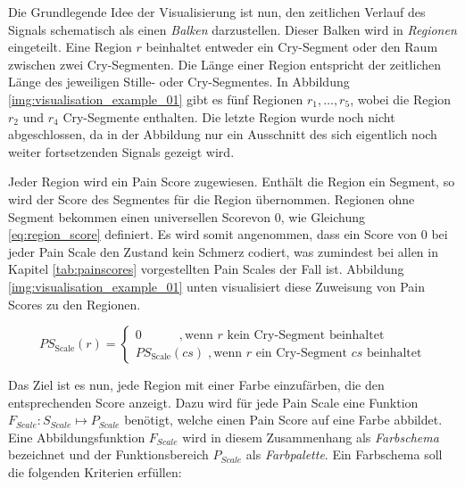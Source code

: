 Die Grundlegende Idee der Visualisierung ist nun, den zeitlichen Verlauf des Signals schematisch als einen \emph{Balken} darzustellen. Dieser Balken wird in \emph{Regionen} eingeteilt. Eine Region $r$ beinhaltet entweder ein Cry-Segment oder den Raum zwischen zwei Cry-Segmenten. Die Länge einer Region entspricht der zeitlichen Länge des jeweiligen Stille- oder Cry-Segmentes. In Abbildung \ref{img:visualisation_example_01} gibt es fünf Regionen $r_{1} , \ldots , r_5 $, wobei die Region $r_2$ und $r_4$ Cry-Segmente enthalten. Die letzte Region wurde noch nicht abgeschlossen, da in der Abbildung nur ein Ausschnitt des sich eigentlich noch weiter fortsetzenden Signals gezeigt wird.

Jeder Region wird ein Pain Score zugewiesen. Enthält die Region ein Segment, so wird der Score des Segmentes für die Region übernommen. Regionen ohne Segment bekommen einen \glqq universellen Score\grqq von 0, wie Gleichung  \ref{eq:region_score} definiert. Es wird somit angenommen, dass ein Score von 0 bei jeder Pain Scale den Zustand \glqq kein Schmerz\grqq{} codiert, was zumindest bei allen in Kapitel \ref{tab:painscores} vorgestellten Pain Scales der Fall ist. Abbildung \ref{img:visualisation_example_01} unten visualisiert diese Zuweisung von Pain Scores zu den Regionen.

\begin{equation}
PS_{\text{Scale}}(r) = \begin{cases}
 0 \quad \quad \quad,  \text{wenn } r  \text{ kein Cry-Segment beinhaltet} \\
 PS_{\text{Scale}}(cs) \;, \text{wenn } r  \text{ ein Cry-Segment } cs \text{ beinhaltet}
 \end{cases}	
 \label{eq:region_score}
\end{equation}

Das Ziel ist es nun, jede Region mit einer Farbe einzufärben, die den entsprechenden Score anzeigt. Dazu wird für jede Pain Scale eine Funktion $F_{Scale}:S_{Scale} \mapsto P_{Scale}$ benötigt, welche einen Pain Score auf eine Farbe abbildet. Eine Abbildungsfunktion $F_{Scale}$ wird in diesem Zusammenhang als \emph{Farbschema} bezeichnet und der Funktionsbereich $P_{Scale}$ als \emph{Farbpalette}. Ein Farbschema soll die folgenden Kriterien erfüllen:

